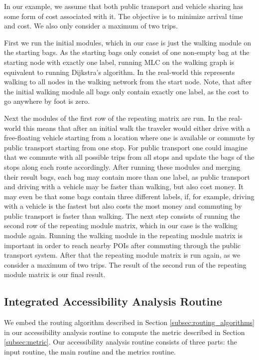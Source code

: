 In our example, we assume that both public transport and vehicle sharing has some form of cost associated with it.
The objective is to minimize arrival time and cost.
We also only consider a maximum of two trips.

First we run the initial modules, which in our case is just the walking module on the starting bags.
As the starting bags only consist of one non-empty bag at the starting node with exactly one label, running MLC on the walking graph is equivalent to running Dijkstra's algorithm.
In the real-world this represents walking to all nodes in the walking network from the start node.
Note, that after the initial walking module all bags only contain exactly one label, as the cost to go anywhere by foot is zero.

Next the modules of the first row of the repeating matrix are run.
In the real-world this means that after an initial walk the traveler would either drive with a free-floating vehicle starting from a location where one is available or commute by public transport starting from one stop.
For public transport one could imagine that we commute with all possible trips from all stops and update the bags of the stops along each route accordingly.
After running these modules and merging their result bags, each bag may contain more than one label, as public transport and driving with a vehicle may be faster than walking, but also cost money.
It may even be that some bags contain three different labels, if, for example, driving with a vehicle is the fastest but also costs the most money and commuting by public transport is faster than walking.
The next step consists of running the second row of the repeating module matrix, which in our case is the walking module again.
Running the walking module in the repeating module matrix is important in order to reach nearby POIs after commuting through the public transport system.
After that the repeating module matrix is run again, as we consider a maximum of two trips.
The result of the second run of the repeating module matrix is our final result.



\subsection{Integrated Accessibility Analysis Routine}
\label{subsec:combining}

We embed the routing algorithm described in Section \ref{subsec:routing_algorithms} in our accessibility analysis routine to compute the metric described in Section \ref{subsec:metric}.
Our accessibility analysis routine consists of three parts: the input routine, the main routine and the metrics routine.

